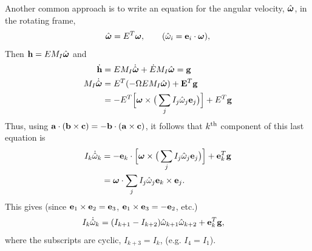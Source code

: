 Another common approach is to write an equation for the angular 
velocity, $\hat{\boldsymbol{\omega}}$, in the rotating frame,  
\begin{align}
\hat{\boldsymbol{\omega}} = E^T\boldsymbol{\omega}, \qquad (\hat\omega_i = \mathbf{ e}_i\cdot\boldsymbol{\omega}),
\end{align}
Then $\mathbf{ h}=E M_I\hat{\boldsymbol{\omega}}$ and 
\begin{align*}
   \dot{\mathbf{ h}} &= E M_I\dot{\hat{\boldsymbol{\omega}}} + \dot E M_I\hat{\boldsymbol{\omega}} = \mathbf{ g} \\
  M_I \dot{\hat{\boldsymbol{\omega}}} &= E^T( - \Omega E M_I\hat{\boldsymbol{\omega}} ) + \mathbf{ E}^T\mathbf{ g} \\
                     &= -E^T\Big[ \boldsymbol{\omega}\times\big( \sum_j I_j \hat\omega_j \mathbf{ e}_j\big) \Big] + E^T\mathbf{ g}
\end{align*}
Thus, using $\mathbf{ a}\cdot(\mathbf{ b}\times{\mathbf c}) = - \mathbf{ b}\cdot(\mathbf{ a}\times{\mathbf c})$, it follows that $k^{\rm th}$ component
of this last equation is 
\begin{align*}
  I_k \dot{\hat\omega}_k  &= - \mathbf{ e}_k\cdot\Big[ \boldsymbol{\omega}\times\big( \sum_j I_j \hat\omega_j \mathbf{ e}_j\big) \Big] + \mathbf{ e}_k^T\mathbf{ g} \\
                      &= \boldsymbol{\omega}\cdot\sum_j I_j \hat\omega_j \mathbf{ e}_k\times\mathbf{ e}_j.
\end{align*}
This gives (since $\mathbf{ e}_1\times\mathbf{ e}_2=\mathbf{ e}_3$, $\mathbf{ e}_1\times\mathbf{ e}_3=-\mathbf{ e}_2$, etc.) 
\begin{align*}
  I_k \dot{\hat\omega}_k  &= (I_{k+1}-I_{k+2}) \hat\omega_{k+1}\hat\omega_{k+2}  + \mathbf{ e}_k^T\mathbf{ g},
\end{align*}
where the subscripts are cyclic, $I_{k+3} = I_{k}$,  (e.g. $I_{4}=I_{1}$). 

